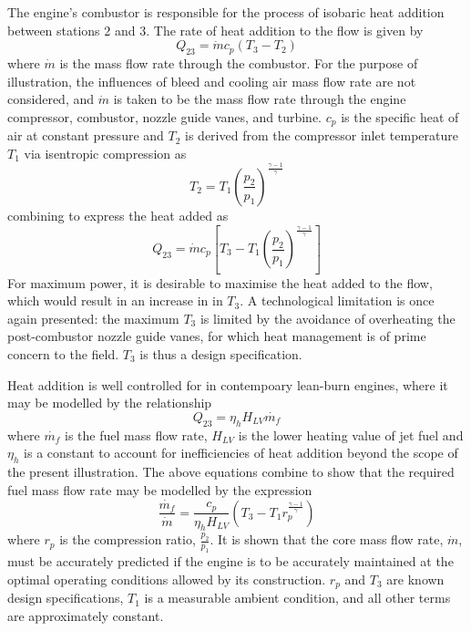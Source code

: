 \documentclass[a4paper, 11pt, oneside]{report}
\begin{document}
The engine's combustor is responsible for the process of isobaric heat addition between stations $2$ and $3$. The rate of heat addition to the flow is given by
\begin{equation}
	Q_{23} = 
	\dot{m}
	c_p
	\left(
		T_3 - T_2
	\right)
\end{equation}
where $\dot{m}$ is the mass flow rate through the combustor. For the purpose of illustration, the influences of bleed and cooling air mass flow rate are not considered, and $\dot{m}$ is taken to be the mass flow rate through the engine compressor, combustor, nozzle guide vanes, and turbine. $c_p$ is the specific heat of air at constant pressure and $T_2$ is derived from the compressor inlet temperature $T_1$ via isentropic compression as
\begin{equation}
	T_2 = 
	T_1
	\left(
		\frac{p_2}{p_1}
	\right)
	^
	\frac{\gamma-1}{\gamma}
\end{equation}
combining to express the heat added as
\begin{equation}
	Q_{23} = 
	\dot{m}
	c_p
	\left[
		T_3 - 
		T_1
		\left(
			\frac{p_2}{p_1}
		\right)
		^
		\frac{\gamma-1}{\gamma}
	\right]
\end{equation}
For maximum power, it is desirable to maximise the heat added to the flow, which would result in an increase in in $T_3$. A technological limitation is once again presented: the maximum $T_3$ is limited by the avoidance of overheating the post-combustor nozzle guide vanes, for which heat management is of prime concern to the field. $T_3$ is thus a design specification.

Heat addition is well controlled for in contempoary lean-burn engines, where it may be modelled by the relationship
\begin{equation}
	Q_{23} = 
	\eta_h
	H_{LV}
	\dot{m_f}
\end{equation}
where $\dot{m_f}$ is the fuel mass flow rate, $H_{LV}$ is the lower heating value of jet fuel and $\eta_h$ is a constant to account for inefficiencies of heat addition beyond the scope of the present illustration. The above equations combine to show that the required fuel mass flow rate may be modelled by the expression
\begin{equation}
	\frac{\dot{m_f}}{\dot{m}}
	=
	\frac{c_p}{\eta_{h}H_{LV}}
	\left(
		T_3 - 
		T_1
		r_p
		^
		\frac{\gamma-1}{\gamma}
	\right)
\end{equation}
where $r_p$ is the compression ratio, $\frac{p_2}{p_1}$. It is shown that the core mass flow rate, $\dot{m}$, must be accurately predicted if the engine is to be accurately maintained at the optimal operating conditions allowed by its construction. $r_p$ and $T_3$ are known design specifications, $T_1$ is a measurable ambient condition, and all other terms are approximately constant. 
\end{document}
